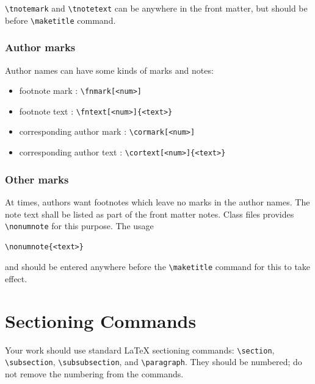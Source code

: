 \documentclass{ceurart}
\begin{document}
\verb|\tnotemark| and \verb|\tnotetext| can be anywhere in
the front matter, but should be before \verb|\maketitle| command.

\subsubsection{Author marks}

Author names can have some kinds of marks and notes:
\begin{itemize}
\item footnote mark : \verb|\fnmark[<num>]|
\item footnote text : \verb|\fntext[<num>]{<text>}|
\item corresponding author mark : \verb|\cormark[<num>]|
\item corresponding author text : \verb|\cortext[<num>]{<text>}|
\end{itemize}

\subsubsection{Other marks}

At times, authors want footnotes which leave no marks in
the author names. The note text shall be listed as part of
the front matter notes. Class files provides
\verb|\nonumnote| for this purpose. The usage
\begin{lstlisting}
\nonumnote{<text>}
\end{lstlisting}
and should be entered anywhere before the \verb|\maketitle|
command for this to take effect. 

\section{Sectioning Commands}

Your work should use standard \LaTeX{} sectioning commands:
\verb|\section|, \verb|\subsection|,
\verb|\subsubsection|, and
\verb|\paragraph|. They should be numbered; do not remove
the numbering from the commands.
\end{document}
